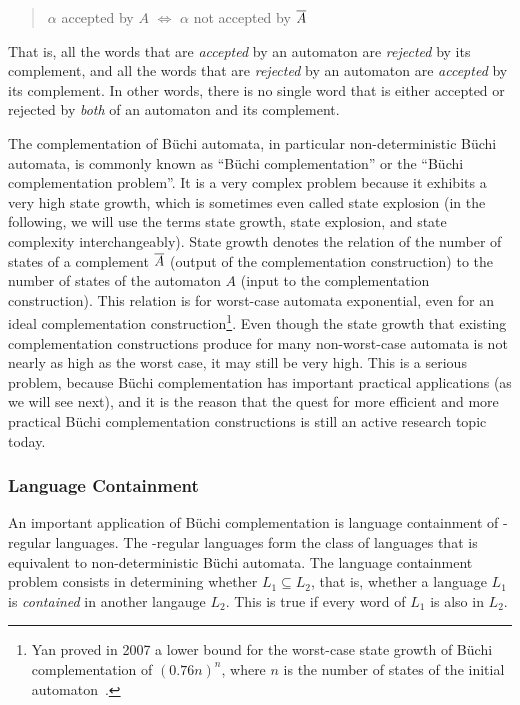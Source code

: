\begin{quote}
\centering
$\alpha$ accepted by $A$ $\Longleftrightarrow$ $\alpha$ not accepted by $\cl1{A}$
\end{quote}

That is, all the words that are \textit{accepted} by an automaton are \textit{rejected} by its complement, and all the words that are \textit{rejected} by an automaton are \textit{accepted} by its complement. In other words, there is no single word that is either accepted or rejected by \textit{both} of an automaton and its complement.

The complementation of Büchi automata, in particular non-deterministic Büchi automata, is commonly known as ``Büchi complementation'' or the ``Büchi complementation problem''. It is a very complex problem because it exhibits a very high state growth, which is sometimes even called state explosion (in the following, we will use the terms state growth, state explosion, and state complexity interchangeably). State growth denotes the relation of the number of states of a complement $\cl1{A}$ (output of the complementation construction) to the number of states of the automaton $A$ (input to the complementation construction). This relation is for worst-case automata exponential, even for an ideal complementation construction\footnote{Yan proved in 2007 a lower bound for the worst-case state growth of Büchi complementation of $(0.76n)^n$, where $n$ is the number of states of the initial automaton~\cite{DBLP:journals/corr/abs-0802-1226}.}. Even though the state growth that existing complementation constructions produce for many non-worst-case automata is not nearly as high as the worst case, it may still be very high. This is a serious problem, because Büchi complementation has important practical applications (as we will see next), and it is the reason that the quest for more efficient and more practical Büchi complementation constructions is still an active research topic today.


\subsubsection{Language Containment}
An important application of Büchi complementation is language containment of \om-regular languages. The \om-regular languages form the class of languages that is equivalent to non-deterministic Büchi automata. The language containment problem consists in determining whether $L_1 \subseteq L_2$, that is, whether a language $L_1$ is \textit{contained} in another langauge $L_2$. This is true if every word of $L_1$ is also in $L_2$.

